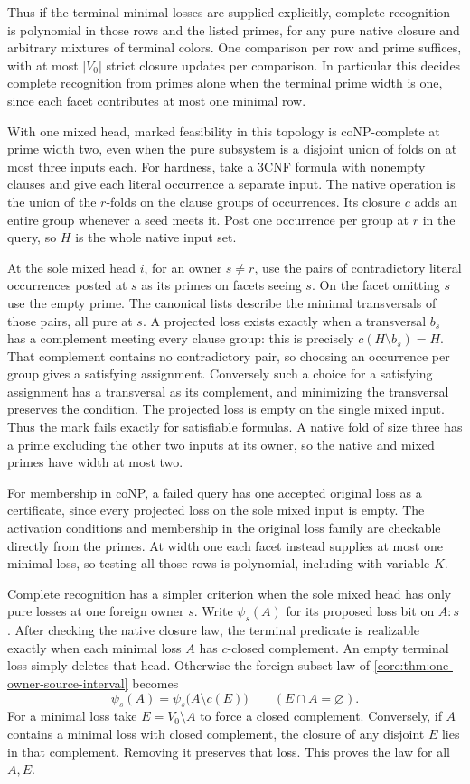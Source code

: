 Thus if the terminal minimal losses are supplied
explicitly, complete recognition is polynomial in
those rows and the listed primes, for any pure native
closure and arbitrary mixtures of terminal colors.
One comparison per row and prime suffices, with at
most $|V_0|$ strict closure updates per comparison.
In particular this decides complete recognition from
primes alone when the terminal prime width is one,
since each facet contributes at most one minimal row.

With one mixed head, marked feasibility in this topology
is coNP-complete at prime width two, even when the pure
subsystem is a disjoint union of folds on at most three
inputs each. For hardness, take a 3CNF formula with
nonempty clauses and give each literal occurrence a
separate input. The native operation is the union of
the $r$-folds on the clause groups of occurrences.
Its closure $c$ adds an entire group whenever a seed
meets it. Post one occurrence per group at $r$ in the
query, so $H$ is the whole native input set.

At the sole mixed head $i$, for an owner $s\ne r$, use
the pairs of contradictory literal occurrences posted
at $s$ as its primes on facets seeing $s$. On the
facet omitting $s$ use the empty prime. The canonical
lists describe the minimal transversals of those
pairs, all pure at $s$. A projected loss exists exactly
when a transversal $b_s$ has a complement meeting
every clause group: this is precisely $c(H\setminus
b_s)=H$. That complement contains no contradictory
pair, so choosing an occurrence per group gives a
satisfying assignment. Conversely such a choice for
a satisfying assignment has a transversal as its
complement, and minimizing the transversal preserves
the condition. The projected loss is empty on the
single mixed input. Thus the mark fails exactly for
satisfiable formulas. A native fold of size three
has a prime excluding the other two inputs at its
owner, so the native and mixed primes have width
at most two.

For membership in coNP, a failed query has one
accepted original loss as a certificate, since every
projected loss on the sole mixed input is empty.
The activation conditions and membership in the
original loss family are checkable directly from the
primes. At width one each facet instead supplies at
most one minimal loss, so testing all those rows is
polynomial, including with variable $K$.

Complete recognition has a simpler criterion when the
sole mixed head has only pure losses at one foreign
owner $s$. Write $\psi_s(A)$ for its proposed loss bit
on $A:s$. After checking the native closure law, the
terminal predicate is realizable exactly when each
minimal loss $A$ has $c$-closed complement. An empty
terminal loss simply deletes that head. Otherwise the
foreign subset law of
\cref{core:thm:one-owner-source-interval} becomes
\[
 \psi_s(A)=\psi_s\bigl(A\setminus c(E)\bigr)
 \qquad(E\cap A=\varnothing).
\]
For a minimal loss take $E=V_0\setminus A$ to force a
closed complement. Conversely, if $A$ contains a minimal
loss with closed complement, the closure of any disjoint
$E$ lies in that complement. Removing it preserves that
loss. This proves the law for all $A,E$.

